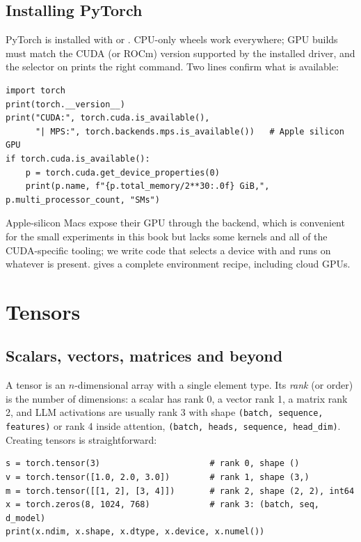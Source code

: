 \subsection{Installing PyTorch}
PyTorch is installed with  or . CPU-only wheels work everywhere; GPU builds must match
the CUDA (or ROCm) version supported by the installed driver, and the selector on  prints the
right command. Two lines confirm what is available:

\begin{lstlisting}[caption={Checking the installation and available accelerators.},label={lst:pytorch:check}]
import torch
print(torch.__version__)
print("CUDA:", torch.cuda.is_available(),
      "| MPS:", torch.backends.mps.is_available())   # Apple silicon GPU
if torch.cuda.is_available():
    p = torch.cuda.get_device_properties(0)
    print(p.name, f"{p.total_memory/2**30:.0f} GiB,", p.multi_processor_count, "SMs")
\end{lstlisting}

Apple-silicon Macs expose their GPU through the  backend, which is convenient for the small
experiments in this book but lacks some kernels and all of the CUDA-specific tooling; we write code that
selects a device with  and runs on whatever is present. 
gives a complete environment recipe, including cloud GPUs.

\section{Tensors}\label{sec:pytorch:tensors}

\subsection{Scalars, vectors, matrices and beyond}
A tensor is an $n$-dimensional array with a single element type. Its \emph{rank} (or order) is the number
of dimensions: a scalar has rank 0, a vector rank 1, a matrix rank 2, and LLM activations are usually rank 3
with shape \texttt{(batch, sequence, features)} or rank 4 inside attention,
\texttt{(batch, heads, sequence, head\_dim)}. Creating tensors is straightforward:

\begin{lstlisting}[caption={Creating tensors of different ranks.},label={lst:pytorch:create}]
s = torch.tensor(3)                      # rank 0, shape ()
v = torch.tensor([1.0, 2.0, 3.0])        # rank 1, shape (3,)
m = torch.tensor([[1, 2], [3, 4]])       # rank 2, shape (2, 2), int64
x = torch.zeros(8, 1024, 768)            # rank 3: (batch, seq, d_model)
print(x.ndim, x.shape, x.dtype, x.device, x.numel())
\end{lstlisting}

